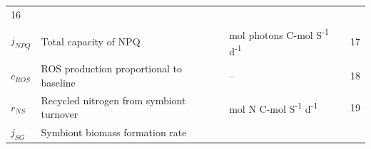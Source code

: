 \documentclass[]{elsarticle} %
\begin{document}
\begin{longtable}[c]{@{}llll@{}}
\begin{minipage}[t]{0.10\columnwidth}
16
\strut\end{minipage}\tabularnewline
\begin{minipage}[t]{0.10\columnwidth}\raggedright\strut
\(j_{NPQ}\)
\strut\end{minipage} &
\begin{minipage}[t]{0.45\columnwidth}\raggedright\strut
Total capacity of NPQ
\strut\end{minipage} &
\begin{minipage}[t]{0.27\columnwidth}\raggedright\strut
mol photons C-mol S\textsuperscript{-1} d\textsuperscript{-1}
\strut\end{minipage} &
\begin{minipage}[t]{0.10\columnwidth}\raggedright\strut
17
\strut\end{minipage}\tabularnewline
\begin{minipage}[t]{0.10\columnwidth}\raggedright\strut
\(c_{ROS}\)
\strut\end{minipage} &
\begin{minipage}[t]{0.45\columnwidth}\raggedright\strut
ROS production proportional to baseline
\strut\end{minipage} &
\begin{minipage}[t]{0.27\columnwidth}\raggedright\strut
--
\strut\end{minipage} &
\begin{minipage}[t]{0.10\columnwidth}\raggedright\strut
18
\strut\end{minipage}\tabularnewline
\begin{minipage}[t]{0.10\columnwidth}\raggedright\strut
\(r_{NS}\)
\strut\end{minipage} &
\begin{minipage}[t]{0.45\columnwidth}\raggedright\strut
Recycled nitrogen from symbiont turnover
\strut\end{minipage} &
\begin{minipage}[t]{0.27\columnwidth}\raggedright\strut
mol N C-mol S\textsuperscript{-1} d\textsuperscript{-1}
\strut\end{minipage} &
\begin{minipage}[t]{0.10\columnwidth}\raggedright\strut
19
\strut\end{minipage}\tabularnewline
\begin{minipage}[t]{0.10\columnwidth}\raggedright\strut
\(j_{SG}\)
\strut\end{minipage} &
\begin{minipage}[t]{0.45\columnwidth}\raggedright\strut
Symbiont biomass formation rate
\strut\end{minipage} &

\end{longtable}
\end{document}
